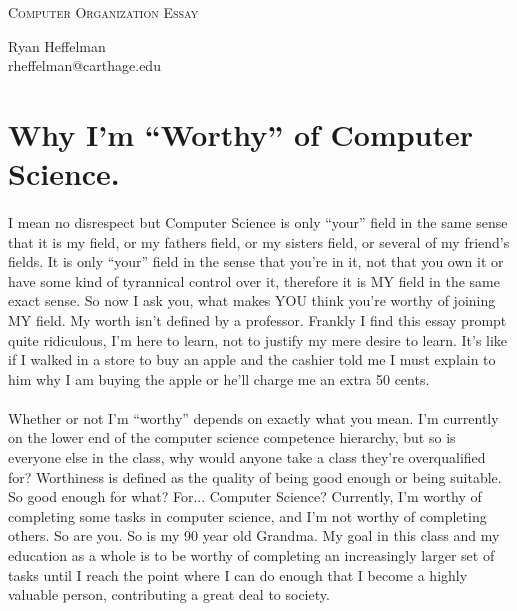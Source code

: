 \documentclass[12pt]{article}
\makeatletter
\newcommand{\soptitle}{Computer Organization Essay}
\newcommand{\yourname}{Ryan Heffelman}
\newcommand{\youremail}{rheffelman@carthage.edu}
\makeatother
\begin{document}
\begin{center}{\huge \scshape \soptitle}\end{center}
\begin{center}\vspace{0.2em} {\Large \yourname\\}
  {\youremail}\end{center}

\section*{Why I'm ``Worthy'' of Computer Science.}

\paragraph{}

I mean no disrespect but Computer Science is only ``your'' field in the same sense that it is my field, or my fathers field, or my sisters field, or several of my friend's fields. It is only ``your'' field in the sense that you're in it, not that you own it or have some kind of tyrannical control over it, therefore it is MY field in the same exact sense. So now I ask you, what makes YOU think you're worthy of joining MY field. My worth isn't defined by a professor. Frankly I find this essay prompt quite ridiculous, I'm here to learn, not to justify my mere desire to learn. It's like if I walked in a store to buy an apple and the cashier told me I must explain to him why I am buying the apple or he'll charge me an extra 50 cents.

\paragraph{}

Whether or not I'm ``worthy'' depends on exactly what you mean. I'm currently on the lower end of the computer science competence hierarchy, but so is everyone else in the class, why would anyone take a class they're overqualified for? Worthiness is defined as the quality of being good enough or being suitable. So good enough for what? For... Computer Science? Currently, I'm worthy of completing some tasks in computer science, and I'm not worthy of completing others. So are you. So is my 90 year old Grandma. My goal in this class and my education as a whole is to be worthy of completing an increasingly larger set of tasks until I reach the point where I can do enough that I become a highly valuable person, contributing a great deal to society.
\end{document}
